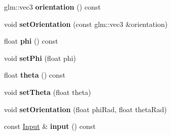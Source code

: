 \begin{DoxyCompactItemize}
\item 
\hypertarget{classCamera_af6b0d4052d268bc0674ed5dd53068fc9}{}glm\+::vec3 {\bfseries orientation} () const \label{classCamera_af6b0d4052d268bc0674ed5dd53068fc9}

\item 
\hypertarget{classCamera_a015160787796d34df98db2e23cb3387e}{}void {\bfseries set\+Orientation} (const glm\+::vec3 \&orientation)\label{classCamera_a015160787796d34df98db2e23cb3387e}

\item 
\hypertarget{classCamera_ae7bb2862b1a76e2651f756f0caf615d0}{}float {\bfseries phi} () const \label{classCamera_ae7bb2862b1a76e2651f756f0caf615d0}

\item 
\hypertarget{classCamera_a75de7f8740d9ecb21dbc1a42cbee5117}{}void {\bfseries set\+Phi} (float phi)\label{classCamera_a75de7f8740d9ecb21dbc1a42cbee5117}

\item 
\hypertarget{classCamera_a4443693aa3a0390e24429a0be0e2b9d2}{}float {\bfseries theta} () const \label{classCamera_a4443693aa3a0390e24429a0be0e2b9d2}

\item 
\hypertarget{classCamera_a79cc39c9b41f69453fe34f1810be8814}{}void {\bfseries set\+Theta} (float theta)\label{classCamera_a79cc39c9b41f69453fe34f1810be8814}

\item 
\hypertarget{classCamera_a2e3137139562efd184a7dd3606de9ded}{}void {\bfseries set\+Orientation} (float phi\+Rad, float theta\+Rad)\label{classCamera_a2e3137139562efd184a7dd3606de9ded}

\item 
\hypertarget{classCamera_a2c95537205c12327a6fe61462680c1da}{}const \hyperlink{classInput}{Input} \& {\bfseries input} () const \label{classCamera_a2c95537205c12327a6fe61462680c1da}

\end{DoxyCompactItemize}
